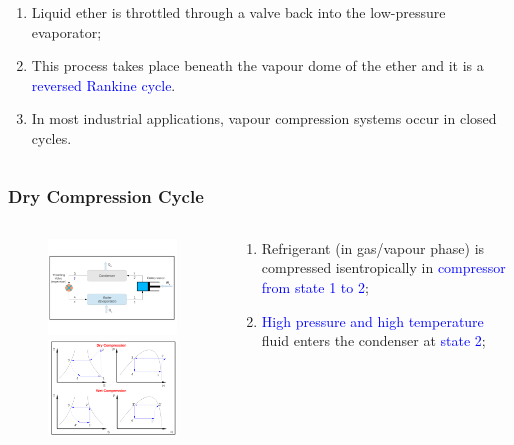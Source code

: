 \documentclass[10pt,compress]{beamer}
\begin{document}
\begin{frame}
\begin{columns}
\begin{column}[c]{0.55\linewidth}
\begin{enumerate}[(1)]
   \item <2-> Liquid ether is throttled through a valve back into the low-pressure evaporator;
   \item <2-> This process takes place beneath the vapour dome of the ether and it is a \textcolor{blue}{reversed Rankine cycle}.
   \item <3-> In most industrial applications, vapour compression systems occur in closed cycles.
  \end{enumerate}
 \end{column}  
\end{columns}

\end{frame}


\begin{frame}
 \frametitle{Dry Compression Cycle} 
  \begin{columns}
   \begin{column}[c]{0.5\linewidth}
    \begin{figure}%
     \vbox{
      \includegraphics[width=5.5cm,clip]{./Pics/Overview_Refrig12}
      \vspace{-.5cm}
      \includegraphics[width=4.5cm,clip]{./Pics/Overview_Refrig13}}
    \end{figure}  
   \end{column}  
   \begin{column}[c]{0.5\linewidth}
  \begin{enumerate}[(1)] \scriptsize
   \item <1-> Refrigerant (in gas/vapour phase) is compressed isentropically in \textcolor{blue}{compressor from state 1 to 2}; 
   \item <1-> \textcolor{blue}{High pressure and high temperature} fluid enters the condenser at \textcolor{blue}{state 2};

\end{enumerate}
\end{column}
\end{columns}
\end{frame}
\end{document}
